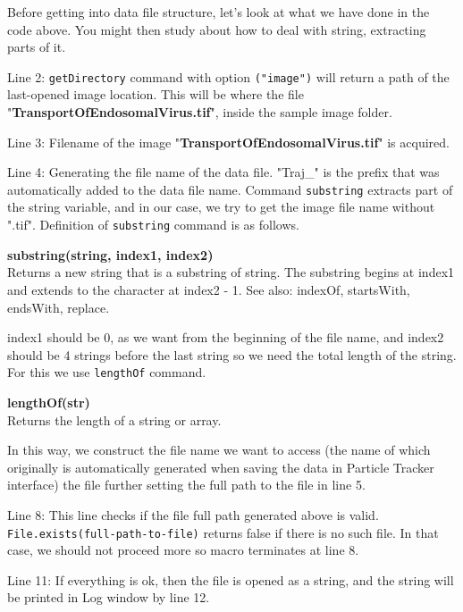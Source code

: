 \documentclass[11pt,a4paper,oneside]{report}
\newenvironment{indentCom}%
{\begin{list}{}%
         {\setlength{\leftmargin}{1em}}%
         \item[]%
}
{\end{list}}
\newcommand{\ilcom}[1]{\texttt{\small#1}}
\begin{document}
Before getting into data file structure, let's look at what we have done in the code above. You might then study about how to deal with string, extracting parts of it. 
\begin{itemize}
\item Line 2: \ilcom{getDirectory} command with option \ilcom{("image")} will return a path of the last-opened image location. This will be where the file "\textbf{TransportOfEndosomalVirus.tif}", inside the sample image folder. 
\item Line 3: Filename of the image  "\textbf{TransportOfEndosomalVirus.tif}" is acquired. 
\item Line 4: Generating the file name of the data file. "Traj\_" is the prefix that was automatically added to the data file name. Command \ilcom{substring} extracts part of the string variable, and in our case, we try to get the image file name without ".tif". Definition of \ilcom{substring} command is as follows.

\begin{indentCom}
\textbf{substring(string, index1, index2)}\\
Returns a new string that is a substring of string. The substring begins at index1 and extends to the character at index2 - 1. See also: indexOf, startsWith, endsWith, replace.
\end{indentCom}

index1 should be 0, as we want from the beginning of the file name, and index2 should be 4 strings before the last string so we need the total length of the string. For this we use \ilcom{lengthOf} command. 
\begin{indentCom}
\textbf{lengthOf(str)}\\
Returns the length of a string or array.
\end{indentCom}
In this way, we construct the file name we want to access (the name of which originally is automatically generated when saving the data in Particle Tracker interface) the file further setting the full path to the file in line 5. 
\item Line 8: This line checks if the file full path generated above is valid. \ilcom{File.exists(full-path-to-file)} returns false if there is no such file. In that case, we should not proceed more so macro terminates at line 8. 
\item Line 11: If everything is ok, then the file is opened as a string, and the string will be printed in Log window by line 12. 
\end{itemize}
\end{document}
